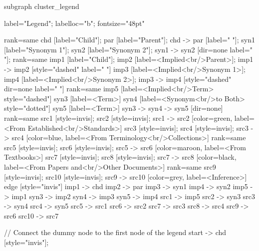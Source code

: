\documentclass{article}
\begin{document}
{subgraph cluster_legend {

    label="Legend";
    labelloc="b";
    fontsize="48pt"

    {
        rank=same
        chd [label="Child"];
        par [label="Parent"];
        chd -> par [label="                "];
        syn1 [label="Synonym 1"];
        syn2 [label="Synonym 2"];
        syn1 -> syn2 [dir=none label="                "];
    }
    {
        rank=same
        imp1 [label="Child"];
        imp2 [label=<Implied<br/>Parent>];
        imp1 -> imp2 [style="dashed" label="                "]
        imp3 [label=<Implied<br/>Synonym 1>];
        imp4 [label=<Implied<br/>Synonym 2>];
        imp3 -> imp4 [style="dashed" dir=none label="                "]
    }
    {
        rank=same
        imp5 [label=<Implied<br/>Term> style="dashed"]
        syn3 [label=<Term>]
        syn4 [label=<Synonym<br/>to Both> style="dotted"]
        syn5 [label=<Term>]
        syn3 -> syn4 -> syn5 [dir=none]
    }
{
rank=same
src1 [style=invis];
src2 [style=invis];
src1 -> src2 [color=green, label=<From Established<br/>Standards>]
src3 [style=invis];
src4 [style=invis];
src3 -> src4 [color=blue, label=<From Terminology<br/>Collections>]
}
{
rank=same
src5 [style=invis];
src6 [style=invis];
src5 -> src6 [color=maroon, label=<From Textbooks>]
src7 [style=invis];
src8 [style=invis];
src7 -> src8 [color=black, label=<From Papers and<br/>Other Documents>]
}
{
rank=same
src9 [style=invis];
src10 [style=invis];
src9 -> src10 [color=grey, label=<Inference>]
}
edge [style="invis"]
imp1 -> chd
imp2 -> par
imp3 -> syn1
imp4 -> syn2
imp5 -> imp1
syn3 -> imp2
syn4 -> imp3
syn5 -> imp4
src1 -> imp5
src2 -> syn3
src3 -> syn4
src4 -> syn5
src5 -> src1
src6 -> src2
src7 -> src3
src8 -> src4
src9 -> src6
src10 -> src7
}

// Connect the dummy node to the first node of the legend
start -> chd [style="invis"];
}
\end{document}
